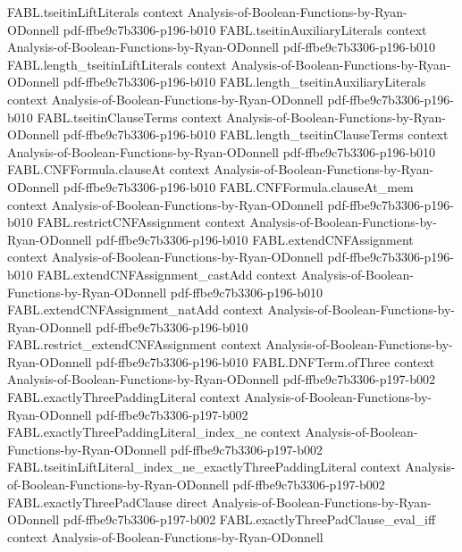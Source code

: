 \begin{theorem}
\proofstep
  {FABL.tseitinLiftLiterals}
  {context}
  {Analysis-of-Boolean-Functions-by-Ryan-ODonnell}
  {pdf-ffbe9c7b3306-p196-b010}
\proofstep
  {FABL.tseitinAuxiliaryLiterals}
  {context}
  {Analysis-of-Boolean-Functions-by-Ryan-ODonnell}
  {pdf-ffbe9c7b3306-p196-b010}
\proofstep
  {FABL.length_tseitinLiftLiterals}
  {context}
  {Analysis-of-Boolean-Functions-by-Ryan-ODonnell}
  {pdf-ffbe9c7b3306-p196-b010}
\proofstep
  {FABL.length_tseitinAuxiliaryLiterals}
  {context}
  {Analysis-of-Boolean-Functions-by-Ryan-ODonnell}
  {pdf-ffbe9c7b3306-p196-b010}
\proofstep
  {FABL.tseitinClauseTerms}
  {context}
  {Analysis-of-Boolean-Functions-by-Ryan-ODonnell}
  {pdf-ffbe9c7b3306-p196-b010}
\proofstep
  {FABL.length_tseitinClauseTerms}
  {context}
  {Analysis-of-Boolean-Functions-by-Ryan-ODonnell}
  {pdf-ffbe9c7b3306-p196-b010}
\proofstep
  {FABL.CNFFormula.clauseAt}
  {context}
  {Analysis-of-Boolean-Functions-by-Ryan-ODonnell}
  {pdf-ffbe9c7b3306-p196-b010}
\proofstep
  {FABL.CNFFormula.clauseAt_mem}
  {context}
  {Analysis-of-Boolean-Functions-by-Ryan-ODonnell}
  {pdf-ffbe9c7b3306-p196-b010}
\proofstep
  {FABL.restrictCNFAssignment}
  {context}
  {Analysis-of-Boolean-Functions-by-Ryan-ODonnell}
  {pdf-ffbe9c7b3306-p196-b010}
\proofstep
  {FABL.extendCNFAssignment}
  {context}
  {Analysis-of-Boolean-Functions-by-Ryan-ODonnell}
  {pdf-ffbe9c7b3306-p196-b010}
\proofstep
  {FABL.extendCNFAssignment_castAdd}
  {context}
  {Analysis-of-Boolean-Functions-by-Ryan-ODonnell}
  {pdf-ffbe9c7b3306-p196-b010}
\proofstep
  {FABL.extendCNFAssignment_natAdd}
  {context}
  {Analysis-of-Boolean-Functions-by-Ryan-ODonnell}
  {pdf-ffbe9c7b3306-p196-b010}
\proofstep
  {FABL.restrict_extendCNFAssignment}
  {context}
  {Analysis-of-Boolean-Functions-by-Ryan-ODonnell}
  {pdf-ffbe9c7b3306-p196-b010}
\proofstep
  {FABL.DNFTerm.ofThree}
  {context}
  {Analysis-of-Boolean-Functions-by-Ryan-ODonnell}
  {pdf-ffbe9c7b3306-p197-b002}
\proofstep
  {FABL.exactlyThreePaddingLiteral}
  {context}
  {Analysis-of-Boolean-Functions-by-Ryan-ODonnell}
  {pdf-ffbe9c7b3306-p197-b002}
\proofstep
  {FABL.exactlyThreePaddingLiteral_index_ne}
  {context}
  {Analysis-of-Boolean-Functions-by-Ryan-ODonnell}
  {pdf-ffbe9c7b3306-p197-b002}
\proofstep
  {FABL.tseitinLiftLiteral_index_ne_exactlyThreePaddingLiteral}
  {context}
  {Analysis-of-Boolean-Functions-by-Ryan-ODonnell}
  {pdf-ffbe9c7b3306-p197-b002}
\proofstep
  {FABL.exactlyThreePadClause}
  {direct}
  {Analysis-of-Boolean-Functions-by-Ryan-ODonnell}
  {pdf-ffbe9c7b3306-p197-b002}
\proofstep
  {FABL.exactlyThreePadClause_eval_iff}
  {context}
  {Analysis-of-Boolean-Functions-by-Ryan-ODonnell}

\end{theorem}

